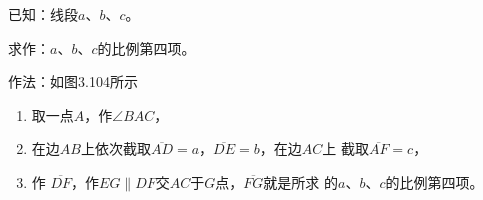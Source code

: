 \begin{figure}
    \begin{minipage}[t]{0.38\linewidth}
    \centering
  \begin{tikzpicture}[>=latex, scale=1]
    \end{tikzpicture}
    \caption{}
    \end{minipage}
    \begin{minipage}[t]{0.58\linewidth}
    \centering
    \begin{tikzpicture}[>=latex, scale=.8]
    \end{tikzpicture}
    \caption{}
    \end{minipage}
    \end{figure}


\begin{example}
    已知：线段$a$、$b$、$c$。

    求作：$a$、$b$、$c$的比例第四项。

    作法：如图3.104所示
\begin{enumerate}
    \item 取一点$A$，作$\angle BAC$，
    \item 在边$AB$上依次截取$\overline{AD}=a$，$\overline{DE}=b$，在边$AC$上
    截取$\overline{AF}=c$，
    \item 作
    $\overline{DF}$，作$EG\parallel DF$交$AC$于$G$点，$\overline{FG}$就是所求
    的$a$、$b$、$c$的比例第四项。
\end{enumerate}
\end{example}    

